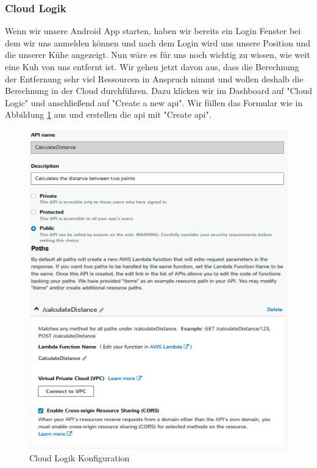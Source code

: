 \subsubsection{Cloud Logik}
Wenn wir unsere Android App starten, haben wir bereits ein Login Fenster bei dem wir uns anmelden können und nach dem Login wird uns unsere Position und die unserer Kühe angezeigt. Nun wäre es für uns noch wichtig zu wissen, wie weit eine Kuh von uns entfernt ist. Wir gehen jetzt davon aus, dass die Berechnung der Entfernung sehr viel Ressourcen in Anspruch nimmt und wollen deshalb die Berechnung in der Cloud durchführen. Dazu klicken wir im Dashboard auf "Cloud Logic" und anschließend auf "Create a new \gls{api}". Wir füllen das Formular wie in Abbildung \ref{fig:cloudlogicsetup} aus und erstellen die \gls{api} mit "Create \gls{api}".

\begin{figure}[h!]
	\centering
	\includegraphics[width=1\linewidth]{Pictures/CloudLogicSetup}
	\caption[Cloud Logik Konfiguration]{Cloud Logik Konfiguration}
	\label{fig:cloudlogicsetup}
\end{figure}

